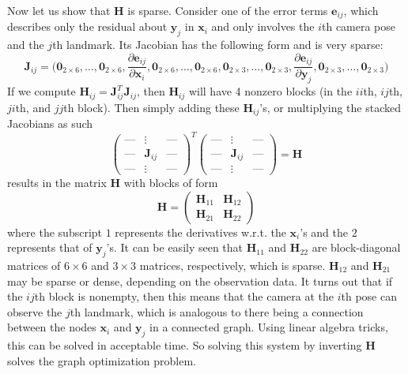 \documentclass{article}
\begin{document}
  Now let us show that $\mathbf{H}$ is sparse. Consider one of the error terms $\mathbf{e}_{ij}$, which describes only the residual about $\mathbf{y}_j$ in $\mathbf{x}_i$ and only involves the $i$th camera pose and the $j$th landmark. Its Jacobian has the following form and is very sparse: 
  \begin{equation}
    \mathbf{J}_{ij} = \bigg( \mathbf{0}_{2 \times 6}, \ldots, \mathbf{0}_{2 \times 6}, \frac{\partial \mathbf{e}_{ij}}{\partial \mathbf{x}_i}, \mathbf{0}_{2 \times 6}, \ldots, \mathbf{0}_{2 \times 6}, \mathbf{0}_{2 \times 3}, \ldots, \mathbf{0}_{2 \times 3}, \frac{\partial \mathbf{e}_{ij}}{\partial \mathbf{y}_j}, \mathbf{0}_{2 \times 3}, \ldots, \mathbf{0}_{2 \times 3} \bigg)
  \end{equation}
  If we compute $\mathbf{H}_{ij} = \mathbf{J}_{ij}^T \mathbf{J}_{ij}$, then $\mathbf{H}_{ij}$ will have 4 nonzero blocks (in the $ii$th, $ij$th, $ji$th, and $jj$th block). Then simply adding these $\mathbf{H}_{ij}$'s, or multiplying the stacked Jacobians as such 
  \begin{equation}
    \begin{pmatrix} \text{---} & \vdots & \text{---} \\ \text{---} & \mathbf{J}_{ij} & \text{---} \\ \text{---} & \vdots & \text{---} \end{pmatrix}^T \begin{pmatrix} \text{---} & \vdots & \text{---} \\ \text{---} & \mathbf{J}_{ij} & \text{---} \\ \text{---} & \vdots & \text{---} \end{pmatrix} = \mathbf{H}
  \end{equation}
  results in the matrix $\mathbf{H}$ with blocks of form 
  \begin{equation}
    \mathbf{H} = \begin{pmatrix} \mathbf{H}_{11} & \mathbf{H}_{12} \\ \mathbf{H}_{21}  & \mathbf{H}_{22} \end{pmatrix}
  \end{equation}
  where the subscript $1$ represents the derivatives w.r.t. the $\mathbf{x}_i$'s and the $2$ represents that of $\mathbf{y}_j$'s. It can be easily seen that $\mathbf{H}_{11}$ and $\mathbf{H}_{22}$ are block-diagonal matrices of $6 \times 6$ and $3 \times 3$ matrices, respectively, which is sparse. $\mathbf{H}_{12}$ and $\mathbf{H}_{21}$ may be sparse or dense, depending on the observation data. It turns out that if the $ij$th block is nonempty, then this means that the camera at the $i$th pose can observe the $j$th landmark, which is analogous to there being a connection between the nodes $\mathbf{x}_i$ and $\mathbf{y}_j$ in a connected graph. Using linear algebra tricks, this can be solved in acceptable time. So solving this system by inverting $\mathbf{H}$ solves the graph optimization problem. 
\end{document}
